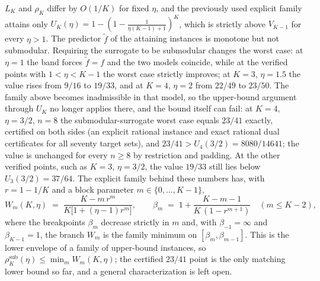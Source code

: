 \begin{remark}\label{rem:exact-gap}
$L_K$ and $\rho_K$ differ by $O(1/K)$ for fixed $\eta$, and the previously
used explicit family attains only
$U_K(\eta)=1-(1-\tfrac{1}{\eta(K-1)+1})^{K}$, which is strictly above
$V_{K-1}$ for every $\eta>1$.
The predictor $\tilde f$ of the attaining instances is monotone but not
submodular.  Requiring the surrogate to be submodular changes the worst
case: at $\eta=1$ the band forces $\tilde f=f$ and the two models coincide,
while at the verified points with $1<\eta<K-1$ the worst case strictly
improves; at $K=3$, $\eta=1.5$ the value rises from $9/16$ to $19/33$, and
at $K=4$, $\eta=2$ from $22/49$ to $23/50$.
The family above becomes inadmissible in that model, so the upper-bound
argument through $U_K$ no longer applies there, and the bound itself can
fail: at $K=4$, $\eta=3/2$, $n=8$ the submodular-surrogate worst case
equals $23/41$ exactly, certified on both sides (an explicit rational
instance and exact rational dual certificates for all seventy target
sets), and $23/41>U_4(3/2)=8080/14641$; the value is unchanged for every
$n\ge8$ by restriction and padding.  At the other verified points, such as
$K=3$, $\eta=3/2$, the value $19/33$ still lies below $U_3(3/2)=37/64$.
The explicit family behind these numbers has, with $r=1-1/K$ and a block
parameter $m\in\{0,\dots,K-1\}$,
\[
  W_m(K,\eta)\;=\;\frac{K-m\,r^{m}}{K\bigl[1+(\eta-1)r^{m}\bigr]},
  \qquad
  \beta_m\;=\;1+\frac{K-m-1}{K\,(1-r^{m+1})}\quad(m\le K-2),
\]
where the breakpoints $\beta_m$ decrease strictly in $m$ and, with
$\beta_{-1}=\infty$ and $\beta_{K-1}=1$, the branch $W_m$ is the family
minimum on $[\beta_m,\beta_{m-1}]$.  This is the lower envelope of a
family of upper-bound instances, so
$\rho^{\mathrm{sub}}_K(\eta)\le\min_mW_m(K,\eta)$; the certified $23/41$
point is the only matching lower bound so far, and a
general characterization is left open.

\end{remark}
